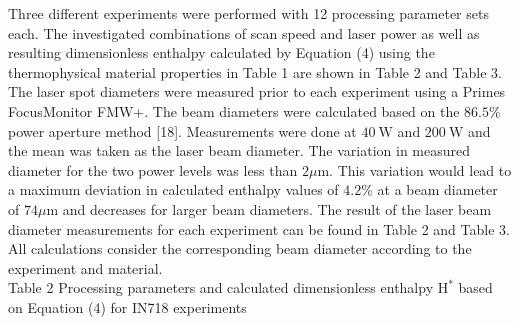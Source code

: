 \documentclass[10pt]{article}
\begin{document}
Three different experiments were performed with 12 processing parameter sets each. The investigated combinations of scan speed and laser power as well as resulting dimensionless enthalpy calculated by Equation (4) using the thermophysical material properties in Table 1 are shown in Table 2 and Table 3. The laser spot diameters were measured prior to each experiment using a Primes FocusMonitor FMW+. The beam diameters were calculated based on the $86.5 \%$ power aperture method [18]. Measurements were done at $40 \mathrm{~W}$ and $200 \mathrm{~W}$ and the mean was taken as the laser beam diameter. The variation in measured diameter for the two power levels was less than $2 \mu \mathrm{m}$. This variation would lead to a maximum deviation in calculated enthalpy values of $4.2 \%$ at a beam diameter of $74 \mu \mathrm{m}$ and decreases for larger beam diameters. The result of the laser beam diameter measurements for each experiment can be found in Table 2 and Table 3. All calculations consider the corresponding beam diameter according to the experiment and material.\\
Table 2 Processing parameters and calculated dimensionless enthalpy $\mathrm{H}^{*}$ based on Equation (4) for IN718 experiments
\end{document}
